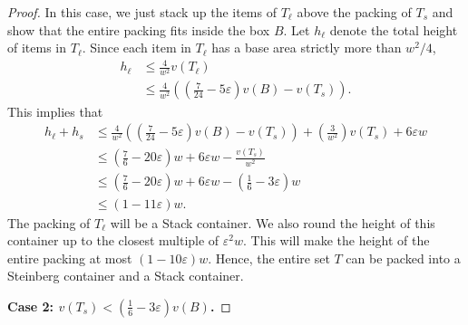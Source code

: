 \documentclass[10pt,a4paper]{amsart}
\newcommand{\eps}{\varepsilon}
\theoremstyle{definition}
\begin{document}
\begin{proof}
In this case, we just stack up the items of $T_\ell$ above the packing of $T_s$ and show that the entire packing fits inside the box $B$.
Let $h_\ell$ denote the total height of items in $T_\ell$.
Since each item in $T_\ell$ has a base area strictly more than $w^2/4$,
\begin{align*}
    h_{\ell}&\le \frac{4}{w^2}v(T_\ell)\\
    &\le \frac{4}{w^2}\left(\left(\frac{7}{24}-5\eps\right)v(B)-v(T_s)\right).
\end{align*}
This implies that
\begin{align*}
    h_{\ell}+h_s&\le \frac{4}{w^2}\left(\left(\frac{7}{24}-5\eps\right)v(B)-v(T_s)\right)+\left(\frac{3}{w^2}\right)v(T_s)+6\eps w\\
            &\le \left(\frac76-20\eps\right)w+6\eps w-\frac{v(T_s)}{w^2}\\
            &\le \left(\frac76-20\eps\right)w+6\eps w-\left(\frac{1}{6}-3\eps\right)w\\
            &\le \left(1-11\eps\right)w.
\end{align*}
The packing of $T_{\ell}$ will be a Stack container.
We also round the height of this container up to the closest multiple of $\eps^2 w$. This will make the height of the entire packing at most
$\left(1-10\eps\right)w$.
Hence, the entire set $T$ can be packed into a Steinberg container and a Stack container.

\textbf{Case 2: $\displaystyle v(T_s)< \left(\frac16-3\eps\right)v(B)$.}


\end{proof}
\end{document}
